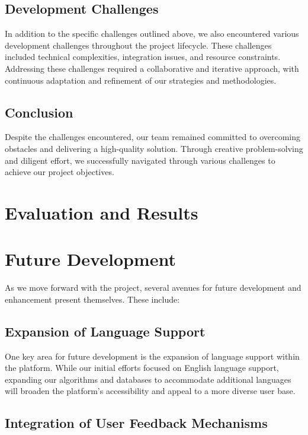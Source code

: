 \documentclass{article}
\begin{document}
\subsection{Development Challenges}

In addition to the specific challenges outlined above, we also encountered various development challenges throughout the project lifecycle. These challenges included technical complexities, integration issues, and resource constraints. Addressing these challenges required a collaborative and iterative approach, with continuous adaptation and refinement of our strategies and methodologies.

\subsection{Conclusion}

Despite the challenges encountered, our team remained committed to overcoming obstacles and delivering a high-quality solution. Through creative problem-solving and diligent effort, we successfully navigated through various challenges to achieve our project objectives.


\section{Evaluation and Results}

\section{Future Development}

As we move forward with the project, several avenues for future development and enhancement present themselves. These include:

\subsection{Expansion of Language Support}

One key area for future development is the expansion of language support within the platform. While our initial efforts focused on English language support, expanding our algorithms and databases to accommodate additional languages will broaden the platform's accessibility and appeal to a more diverse user base.

\subsection{Integration of User Feedback Mechanisms}
\end{document}
